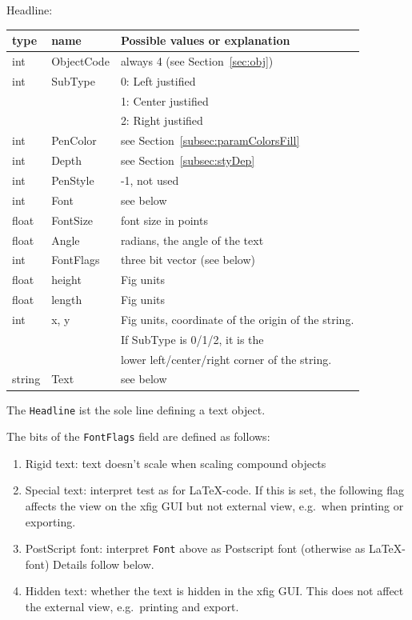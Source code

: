 \documentclass[10pt, a4paper, english]{article}%
\begin{document}
\noindent
Headline: \\
%
\begin{tabular}{lll}
\toprule
type   & name       & Possible values or explanation \\
\midrule
\midrule
int    & ObjectCode & always 4 (see Section~\ref{sec:obj}) \\
int    & SubType    & 0: Left justified \\ %
&&                    1: Center justified \\
&&                    2: Right justified \\
int    & PenColor   & see Section~\ref{subsec:paramColorsFill} \\
int    & Depth      & see Section~\ref{subsec:styDep} \\
int    & PenStyle   & -1, not used \\
int    & Font       & see below \\
float  & FontSize   & font size in points \\
float  & Angle      & radians, the angle of the text \\
int    & FontFlags  & three bit vector (see below) \\
float  & height     & Fig units \\
float  & length     & Fig units \\
int    & x, y       & Fig units, coordinate of the origin of the string.  \\
&&                    If SubType is 0/1/2, it is the \\
&&                    lower left/center/right corner of the string.\\
string & Text       & see below \\
\bottomrule
\end{tabular}

The \texttt{Headline} ist the sole line defining a text object. 

\noindent
The bits of the \texttt{FontFlags} field are defined as follows:
%
\begin{enumerate}
\item[0]
Rigid text: text doesn't scale when scaling compound objects
\item
Special text: interpret test as for \LaTeX-code. 
If this is set, the following flag affects the view on the xfig GUI 
but not external view, e.g.~when printing or exporting. 
\item
PostScript font: interpret \texttt{Font} above 
as Postscript font (otherwise as \LaTeX{}-font) 
Details follow below. 
\item
Hidden text: whether the text is hidden in the xfig GUI\@. 
This does not affect the external view, e.g.~printing and export. 
\end{enumerate}
\end{document}
